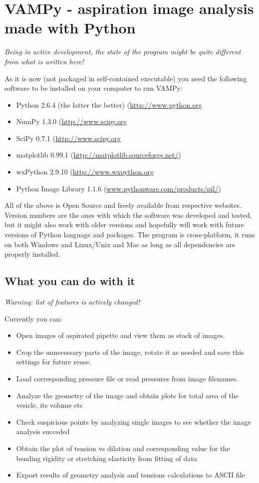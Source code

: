 \section{VAMPy - aspiration image analysis made with Python}\label{vampy}
\emph{Being in active development, the state of the program might be quite different from what is written here!}

As it is now (not packaged in self-contained executable) you need the following software to be installed on your computer to run VAMPy:
\begin{itemize}
	\item Python 2.6.4 (the latter the better) (\url{http://www.python.org}
	\item NumPy 1.3.0 (\url{http://www.scipy.org}
	\item SciPy 0.7.1 (\url{http://www.scipy.org}
	\item matplotlib 0.99.1 (\url{http://matplotlib.sourceforge.net/})
	\item wxPython 2.9.10 (\url{http://www.wxpython.org}
	\item Python Image Library 1.1.6 (\url{www.pythonware.com/products/pil/}) 
\end{itemize}
All of the above is Open Source and freely available from respective websites. Version numbers are the ones with which the software was developed and tested, but it might also work with older versions and hopefully will work with future versions of Python language and packages. The program is cross-platform, it runs on both Windows and Linux/Unix and Mac as long as all dependencies are properly installed.

\subsection{What you can do with it}\label{vampy-features}
\emph{Warning: list of features is actively changed!}

Currently you can:
\begin{itemize}
	\item Open images of aspirated pipette and view them as stack of images.
	\item Crop the unnecessary parts of the image, rotate it as needed and save this settings for future reuse.
	\item Load corresponding pressure file or read pressures from image filenames.
	\item Analyze the geometry of the image and obtain plots for total area of the vesicle, its volume etc
	\item Check suspicious points by analyzing single images to see whether the image analysis succeded
	\item Obtain the plot of tension vs dilation and corresponding value for the bending rigidity or stretching elasticity from fitting of data
	\item Export results of geometry analysis and tensions calculations to ASCII file
\end{itemize}

